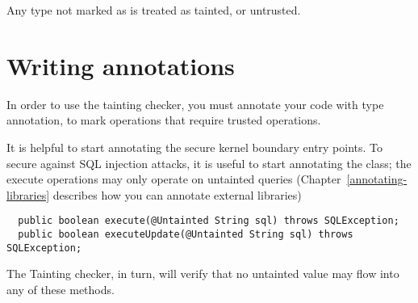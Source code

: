 Any type not marked as  is treated as tainted, or untrusted.


\section{Writing  annotations\label{writing-untainted}}

In order to use the tainting checker, you must annotate your code with
 type annotation, to mark
operations that require trusted operations.

It is helpful to start annotating the secure kernel boundary entry
points.  To secure against SQL injection attacks, it is useful to
start annotating the 
class; the execute operations may only operate on untainted queries
(Chapter~\ref{annotating-libraries} describes how you can annotate
external libraries)

\begin{Verbatim}
  public boolean execute(@Untainted String sql) throws SQLException;
  public boolean executeUpdate(@Untainted String sql) throws SQLException; 
\end{Verbatim}

The Tainting checker, in turn, will verify that no untainted value may flow into
any of these methods.

